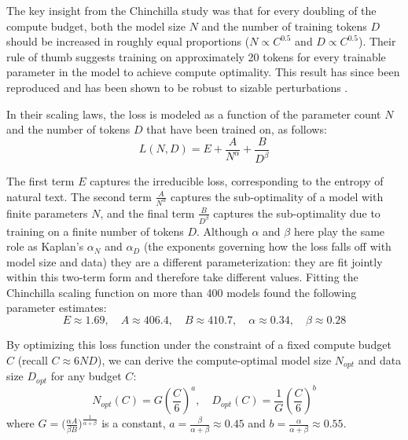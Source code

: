 The key insight from the Chinchilla study  was that for every doubling of the compute budget, both the model size $N$ and the number of training tokens $D$ should be increased in roughly equal proportions ($N \propto C^{0.5}$ and $D \propto C^{0.5}$). Their rule of thumb suggests training on approximately 20 tokens for every trainable parameter in the model to achieve compute optimality. This result has since been reproduced \citep{besiroglu2024chinchilla} and has been shown to be robust to sizable perturbations \citep{schaeffer2025evaluating}.

In their scaling laws, the loss is modeled as a function of the parameter count $N$ and the number of  tokens $D$ that have been trained on, as follows:
\begin{equation}
    L(N,D) = E + \frac{A}{N^{\alpha}} + \frac{B}{D^{\beta}}
\end{equation}

The first term $E$ captures the irreducible loss, corresponding to the entropy of natural text. The second term $\frac{A}{N^{\alpha}}$ captures the sub-optimality of a model with finite parameters $N$, and the final term $\frac{B}{D^{\beta}}$ captures the sub-optimality due to training on a finite number of tokens $D$. Although $\alpha$ and $\beta$ here play the same role as Kaplan's $\alpha_N$ and $\alpha_D$ (the exponents governing how the loss falls off with model size and data) they are a different parameterization: they are fit jointly within this two-term form and therefore take different values. Fitting the Chinchilla scaling function on more than 400 models found the following parameter estimates:
\begin{equation}
    E \approx 1.69, \quad A \approx 406.4, \quad B \approx 410.7, \quad \alpha \approx 0.34, \quad \beta \approx 0.28
\end{equation}

By optimizing this loss function under the constraint of a fixed compute budget $C$ (recall $C \approx 6ND$), we can derive the compute-optimal model size $N_{opt}$ and data size $D_{opt}$ for any budget $C$:
\begin{equation}
    N_{opt}(C) = G \left( \frac{C}{6} \right)^a, \quad D_{opt}(C) = \frac{1}{G} \left( \frac{C}{6} \right)^b
\end{equation}
where $G=\big(\frac{\alpha A}{\beta B}\big)^{\frac{1}{\alpha + \beta}}$ is a constant, $a = \frac{\beta}{\alpha + \beta} \approx 0.45$ and $b = \frac{\alpha}{\alpha + \beta} \approx 0.55$. 

